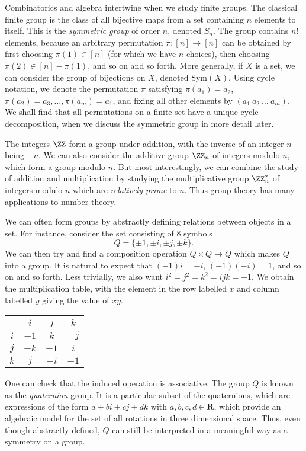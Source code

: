 \begin{example}
    Combinatorics and algebra intertwine when we study finite groups. The classical finite group is the class of all bijective maps from a set containing $n$ elements to itself. This is the \emph{symmetric group} of order $n$, denoted $S_n$. The group contains $n!$ elements, because an arbitrary permutation $\pi: [n] \to [n]$ can be obtained by first choosing $\pi(1) \in [n]$ (for which we have $n$ choices), then choosing $\pi(2) \in [n] - \pi(1)$, and so on and so forth. More generally, if $X$ is a set, we can consider the group of bijections on $X$, denoted $\text{Sym}(X)$. Using cycle notation, we denote the permutation $\pi$ satisfying $\pi(a_1) = a_2$, $\pi(a_2) = a_3, \dots, \pi(a_m) = a_1$, and fixing all other elements by $(a_1\ a_2\ \dots\ a_m)$. We shall find that all permutations on a finite set have a unique cycle decomposition, when we discuss the symmetric group in more detail later.
\end{example}

\begin{example}
    The integers $\ZZ$ form a group under addition, with the inverse of an integer $n$ being $-n$. We can also consider the additive group $\ZZ_n$ of integers modulo $n$, which form a group modulo $n$. But most interestingly, we can combine the study of addition and multiplication by studying the multiplicative group $\ZZ_n^*$ of integers modulo $n$ which are \emph{relatively prime} to $n$. Thus group theory has many applications to number theory.
\end{example}

\begin{example}
    We can often form groups by abstractly defining relations between objects in a set. For instance, consider the set consisting of 8 symbols
    \[ Q = \{ \pm 1, \pm i, \pm j, \pm k \}. \]
    We can then try and find a composition operation $Q \times Q \to Q$ which makes $Q$ into a group. It is natural to expect that $(-1)i = -i$, $(-1)(-i) = 1$, and so on and so forth. Less trivially, we also want $i^2 = j^2 = k^2 = ijk = -1$. We obtain the multiplication table, with the element in the row labelled $x$ and column labelled $y$ giving the value of $xy$.
    \begin{center}
    \begin{tabular}{| c | c c c}
        & $i$ & $j$ & $k$ \\ \hline $i$ & $-1$ & $k$ & $-j$ \\ $j$ & $-k$ & $-1$ & $i$ \\ $k$ & $j$ & $-i$ & $-1$
    \end{tabular}
    \end{center}
    One can check that the induced operation is associative. The group $Q$ is known as the \emph{quaternion} group. It is a particular subset of the quaternions, which are expressions of the form $a + bi + cj + dk$ with $a,b,c,d \in \mathbf{R}$, which provide an algebraic model for the set of all rotations in three dimensional space. Thus, even though abstractly defined, $Q$ can still be interpreted in a meaningful way as a symmetry on a group.
\end{example}

